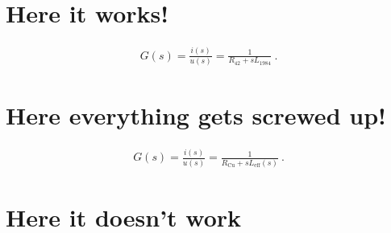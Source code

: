 \documentclass{article}
\newcommand{\ir}[1]{_{\mathrm{#1}}}
\begin{document}
\section{Here it works!}

\emph{\blindtext}

\begin{align}
G(s) = \frac{i(s)}{u(s)} = \frac{ 1 }{R_{42} + s L_{1984} } \:.
\end{align}


\section{Here everything gets screwed up!}

\begin{align}
G(s) = \frac{i(s)}{u(s)} = \frac{ 1 }{R\ir{Cu} + s L\ir{eff}(s)} \:.
\end{align}

\section{Here it doesn't work}

\emph{\blindtext}
\end{document}

